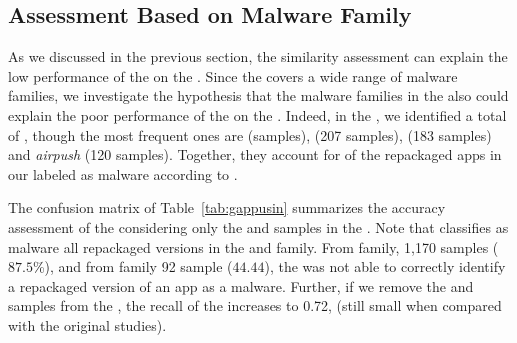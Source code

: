 \subsection{Assessment Based on Malware Family}


As we discussed in the previous
section, the similarity assessment can explain the low performance of the
\mas on the \cds. Since the \cds covers a wide range of malware families, we investigate the
hypothesis that the malware families in the \cds also could
explain the poor performance of the \mas on the \cds.
Indeed, in the \cds, we identified a total of
, though the most frequent
ones are \gps (\appsGps samples),  (207 samples),  (183 samples) and \emph{airpush} (120 samples). Together, they
account for  of the repackaged apps in our \cds labeled as malware according to \vt.




The confusion matrix of Table~\ref{tab:gappusin} summarizes the accuracy assessment of the \mas considering
only the \gps and  samples in the \cds. Note that \vt classifies as malware all repackaged versions in the \gps and 
family. From \gps family, 1,170 samples ($87.5$\%), and from  family 92 sample ($44.44$), the \mas was not able to correctly identify
a repackaged version of an app as a malware. 
Further, if we remove the \gps and 
samples from the \cds, the recall
of the \mas increases to 0.72, (still small when compared with the original studies). 

